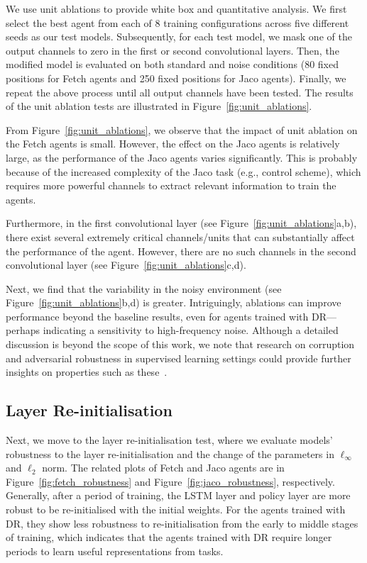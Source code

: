 We use unit ablations to provide white box and quantitative analysis. We first select the best agent from each of 8 training configurations across five different seeds as our test models. Subsequently, for each test model, we mask one of the output channels to zero in the first or second convolutional layers. Then, the modified model is evaluated on both standard and noise conditions (80 fixed positions for Fetch agents and 250 fixed positions for Jaco agents). Finally, we repeat the above process until all output channels have been tested. The results of the unit ablation tests are illustrated in Figure~\ref{fig:unit_ablations}.

From Figure~\ref{fig:unit_ablations}, we observe that the impact of unit ablation on the Fetch agents is small. However, the effect on the Jaco agents is relatively large, as the performance of the Jaco agents varies significantly. This is probably because of the increased complexity of the Jaco task (e.g., control scheme), which requires more powerful channels to extract relevant information to train the agents.

Furthermore, in the first convolutional layer (see Figure~\ref{fig:unit_ablations}a,b), there exist several extremely critical channels/units that can substantially affect the performance of the agent. However, there are no such channels in the second convolutional layer (see Figure~\ref{fig:unit_ablations}c,d).

Next, we find that the variability in the noisy environment (see Figure~\ref{fig:unit_ablations}b,d) is greater. Intriguingly, ablations can improve performance beyond the baseline results, even for agents trained with DR---perhaps indicating a sensitivity to high-frequency noise. Although a detailed discussion is beyond the scope of this work, we note that research on corruption and adversarial robustness in supervised learning settings could provide further insights on properties such as these~\cite{gilmer2019adversarial, hendrycks2019benchmarking}.

\subsection{Layer Re-initialisation}
Next, we move to the layer re-initialisation test, where we evaluate models' robustness to the layer re-initialisation and the change of the parameters in $\ell_{\infty}$ and $\ell_{2}$ norm. The related plots of Fetch and Jaco agents are in Figure~\ref{fig:fetch_robustness} and Figure~\ref{fig:jaco_robustness}, respectively. Generally, after a period of training, the LSTM layer and policy layer are more robust to be re-initialised with the initial weights. For the agents trained with DR, they show less robustness to re-initialisation from the early to middle stages of training, which indicates that the agents trained with DR require longer periods to learn useful representations from tasks.

